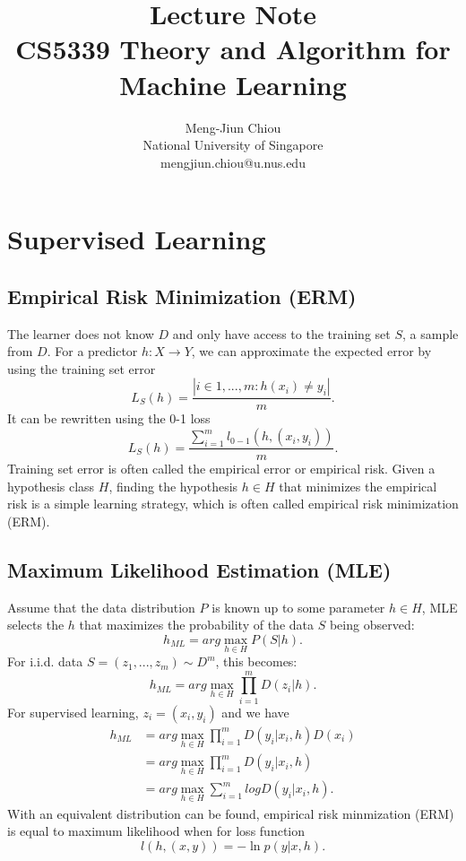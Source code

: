 \documentclass{article}
\title{\textbf{Lecture Note} \\
		\large CS5339 Theory and Algorithm for Machine Learning}
\author{Meng-Jiun Chiou \\ National University of Singapore \\ mengjiun.chiou@u.nus.edu}
\date{}
\begin{document}
    \maketitle 
    \section{Supervised Learning}
    \subsection{Empirical Risk Minimization (ERM)}
    The learner does not know $D$ and only have access to the training set $S$, a sample from $D$. For a predictor $h: X \rightarrow Y$, we can approximate the expected error by using the training set error
    \begin{equation}
    L_S(h) = \frac{|i \in {1,...,m}:h(x_i) \neq y_i|}{m}.
    \end{equation}
    It can be rewritten using the 0-1 loss
    \begin{equation}
    L_S(h) = \frac{\sum_{i=1}^m l_{0-1}(h, (x_i, y_i))}{m}.
    \end{equation}
    Training set error is often called the empirical error or empirical risk. Given a hypothesis class $H$, finding the hypothesis $h \in H$ that minimizes the empirical risk is a simple learning strategy, which is often called empirical risk minimization (ERM).
    
    
    \subsection{Maximum Likelihood Estimation (MLE)}
    Assume that the data distribution $P$ is known up to some parameter $h \in H$, MLE selects the $h$ that maximizes the probability of the data $S$ being observed:
    \begin{equation}
    h_{ML} = arg \max_{h\in H} P(S|h).
    \end{equation}
    For i.i.d. data $S = (z_1,...,z_m) \sim D^m$, this becomes:
    \begin{equation}
    h_{ML} = arg \max_{h \in H} \prod_{i=1}^m D(z_i | h).
    \end{equation}
    For supervised learning, $z_i = (x_i, y_i)$ and we have
    \begin{align}
    h_{ML} &= arg \max_{h \in H} \prod_{i=1}^m D(y_i | x_i, h) D(x_i) \\
    	   &= arg \max_{h \in H} \prod_{i=1}^m D(y_i | x_i, h) \\
           &= arg \max_{h \in H} \sum_{i=1}^m log D(y_i | x_i, h).
    \end{align}
    With an equivalent distribution can be found, empirical risk minmization (ERM) is equal to maximum likelihood when for loss function
    \begin{equation}
    l(h, (x,y)) = -\ln p(y|x,h).
    \end{equation}
    
\end{document}
